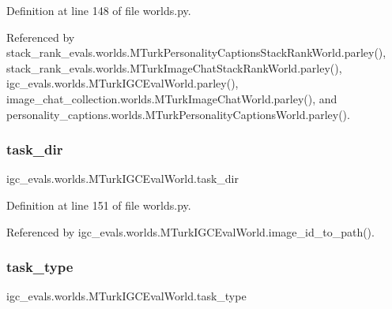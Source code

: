 Definition at line 148 of file worlds.\+py.



Referenced by stack\+\_\+rank\+\_\+evals.\+worlds.\+M\+Turk\+Personality\+Captions\+Stack\+Rank\+World.\+parley(), stack\+\_\+rank\+\_\+evals.\+worlds.\+M\+Turk\+Image\+Chat\+Stack\+Rank\+World.\+parley(), igc\+\_\+evals.\+worlds.\+M\+Turk\+I\+G\+C\+Eval\+World.\+parley(), image\+\_\+chat\+\_\+collection.\+worlds.\+M\+Turk\+Image\+Chat\+World.\+parley(), and personality\+\_\+captions.\+worlds.\+M\+Turk\+Personality\+Captions\+World.\+parley().

\mbox{\label{classigc__evals_1_1worlds_1_1MTurkIGCEvalWorld_a2c16cf5673b1546b5a87d74f1bfdc486}} 
\subsubsection{\texorpdfstring{task\+\_\+dir}{task\_dir}}
{\footnotesize\ttfamily igc\+\_\+evals.\+worlds.\+M\+Turk\+I\+G\+C\+Eval\+World.\+task\+\_\+dir}



Definition at line 151 of file worlds.\+py.



Referenced by igc\+\_\+evals.\+worlds.\+M\+Turk\+I\+G\+C\+Eval\+World.\+image\+\_\+id\+\_\+to\+\_\+path().

\mbox{\label{classigc__evals_1_1worlds_1_1MTurkIGCEvalWorld_ab893bcfbc17987bd7512731901791dd3}} 
\subsubsection{\texorpdfstring{task\+\_\+type}{task\_type}}
{\footnotesize\ttfamily igc\+\_\+evals.\+worlds.\+M\+Turk\+I\+G\+C\+Eval\+World.\+task\+\_\+type}




